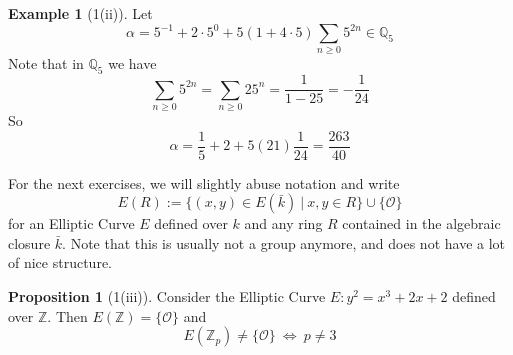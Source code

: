 \documentclass{scrartcl}
\newcommand{\Z}{\mathbb{Z}}
\newcommand{\Q}{\mathbb{Q}}
\renewcommand{\O}{\mathcal{O}}
\theoremstyle{definition}
\newtheorem{prop}[subsection]{Proposition}
\newtheorem{example}[subsection]{Example}
\begin{document}
\begin{example}[1(ii)]
    Let
    \begin{equation*}
        \alpha = 5^{-1} + 2 \cdot 5^0 + 5 (1 + 4 \cdot 5) \sum_{n \geq 0} 5^{2n} \in \Q_5
    \end{equation*}
    Note that in $\Q_5$ we have
    \begin{equation*}
        \sum_{n \geq 0} 5^{2n} = \sum_{n \geq 0} 25^n = \frac 1 {1 - 25} = -\frac 1 {24}
    \end{equation*}
    So
    \begin{equation*}
        \alpha = \frac 1 5 + 2 + 5 (21) \frac 1 {24} = \frac {263} {40}
    \end{equation*}
\end{example}
For the next exercises, we will slightly abuse notation and write
\begin{equation*}
    E(R) := \{ (x, y) \in E(\bar{k}) \ | \ x, y \in R \} \cup \{\O\}
\end{equation*}
for an Elliptic Curve $E$ defined over $k$ and any ring $R$ contained in the algebraic closure $\bar{k}$.
Note that this is usually not a group anymore, and does not have a lot of nice structure.
\begin{prop}[1(iii)]
    Consider the Elliptic Curve $E: y^2 = x^3 + 2x + 2$ defined over $\Z$.
    Then $E(\Z) = \{ \O \}$ and
    \begin{equation*}
        E(\Z_p) \neq \{ \O \} \ \Leftrightarrow \ p \neq 3
    \end{equation*}
\end{prop}
\end{document}

